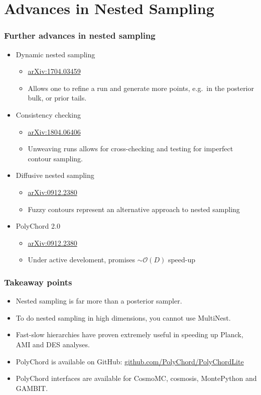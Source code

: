 \documentclass[%
    handout
]{beamer}
\begin{document}
\section{Advances in Nested Sampling}
\begin{frame}
    \frametitle{Further advances in nested sampling}
    \begin{itemize}
        \item Dynamic nested sampling
            \begin{itemize}
                \item \href{https://arxiv.org/abs/1704.03459}{arXiv:1704.03459} 
                \item Allows one to refine a run and generate more points, e.g.\ in the posterior bulk, or prior tails.
            \end{itemize}
        \item Consistency checking
            \begin{itemize}
                \item \href{https://arxiv.org/abs/1804.06406}{arXiv:1804.06406} 
                \item Unweaving runs allows for cross-checking and testing for imperfect contour sampling.
            \end{itemize}
        \item Diffusive nested sampling
            \begin{itemize}
                \item \href{https://arxiv.org/abs/0912.2380}{arXiv:0912.2380} 
                \item Fuzzy contours represent an alternative approach to nested sampling
            \end{itemize}
        \item PolyChord 2.0
            \begin{itemize}
                \item \href{https://arxiv.org/abs/0912.2380}{arXiv:0912.2380} 
                \item Under active develoment, promises $\sim\mathcal{O}(D)$ speed-up
            \end{itemize}
    \end{itemize}
\end{frame}

\begin{frame}
    \frametitle{Takeaway points}
    \begin{itemize}
        \item Nested sampling is far more than a posterior sampler.
        \item To do nested sampling in high dimensions, you cannot use MultiNest.
        \item Fast-slow hierarchies have proven extremely useful in speeding up Planck, AMI and DES analyses.
        \item PolyChord is available on GitHub: \href{https://github.com/PolyChord/PolyChordLite}{github.com/PolyChord/PolyChordLite}
        \item PolyChord interfaces are available for CosmoMC, cosmosis, MontePython and GAMBIT\@.
    \end{itemize}
\end{frame}
\end{document}
